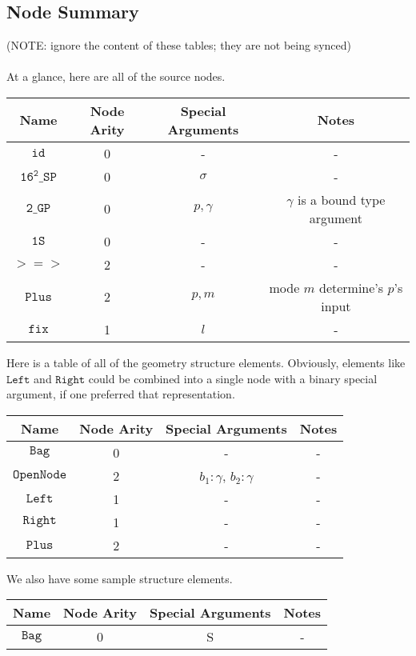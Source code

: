 \documentclass{article}
\newcommand {\oneS}{\mathtt{1S}}
\newcommand {\comp}{\mathtt{>=>}}
\newcommand {\fix}{\mathtt{fix}}
\newcommand {\id}{\mathtt{id}}
\newcommand {\sampP}{\mathtt{16^2\_SP}}
\newcommand {\twoGP}{\mathtt{2\_GP}}
\newcommand {\sleft}{\mathtt{Left}}
\newcommand {\sright}{\mathtt{Right}}
\newcommand {\bag}{\mathtt{Bag}}
\newcommand {\twoBox}{\mathtt{OpenNode}}
\newcommand {\plus}{\mathtt{Plus}}
\begin{document}
\subsection{Node Summary}

(NOTE: ignore the content of these tables; they are not being synced)
\\ \\
At a glance, here are all of the source nodes.
\begin{center}
\begin{tabular}{|c|c|c|c|}\hline
Name & Node Arity & Special Arguments & Notes \\ \hline
$\id$ & 0 & - & -\\ \hline
$\sampP$ & 0 & $\sigma$ & -\\ \hline
$\twoGP$ & 0 & $p, \gamma$ & $\gamma$ is a bound type argument \\ \hline
$\oneS$ & 0 & - & -\\ \hline
$\comp$ & 2 & - & - \\ \hline
$\plus$ & 2 & $p, m$ & mode $m$ determine's $p$'s input \\ \hline
$\fix$ & 1 & $l$ & - \\ \hline
\end{tabular}
\end{center}

Here is a table of all of the geometry structure elements.  Obviously, elements like $\sleft$ and $\sright$ could be combined into a single node with a binary special argument, if one preferred that representation. 

\begin{center}
\begin{tabular}{|c|c|c|c|}\hline
Name & Node Arity & Special Arguments & Notes\\ \hline
$\bag$ & 0 & - & -\\ \hline
$\twoBox$ & 2 & $b_1 : \gamma$, $b_2 : \gamma$ & -\\ \hline
$\sleft$ & 1 & - &  - \\ \hline
$\sright$ & 1 & - &  - \\ \hline
$\plus$ & 2 & - & - \\ \hline
\end{tabular}
\end{center}

We also have some sample structure elements.

\begin{center}
\begin{tabular}{|c|c|c|c|}\hline
Name & Node Arity & Special Arguments & Notes\\ \hline
$\bag$ & 0 & S & - \\ \hline
\end{tabular}
\end{center}
\end{document}
